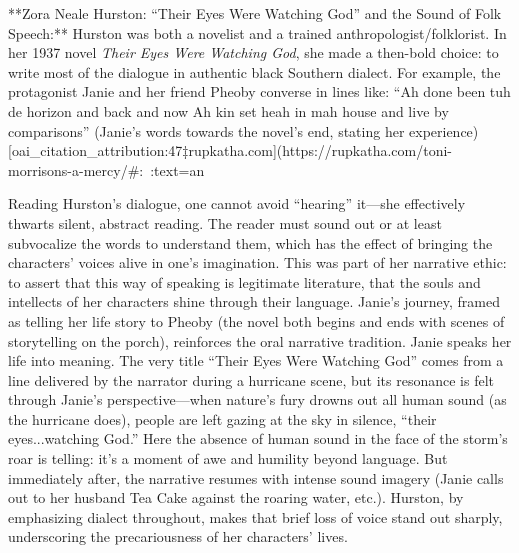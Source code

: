 \documentclass[12pt]{report}
\begin{document}
**Zora Neale Hurston: “Their Eyes Were Watching God” and the Sound of Folk Speech:** Hurston was both a novelist and a trained anthropologist/folklorist. In her 1937 novel \textit{Their Eyes Were Watching God}, she made a then-bold choice: to write most of the dialogue in authentic black Southern dialect. For example, the protagonist Janie and her friend Pheoby converse in lines like: “Ah done been tuh de horizon and back and now Ah kin set heah in mah house and live by comparisons” (Janie’s words towards the novel’s end, stating her experience) [oai_citation_attribution:47‡rupkatha.com](https://rupkatha.com/toni-morrisons-a-mercy/#:~:text=an%

Reading Hurston’s dialogue, one cannot avoid “hearing” it—she effectively thwarts silent, abstract reading. The reader must sound out or at least subvocalize the words to understand them, which has the effect of bringing the characters’ voices alive in one’s imagination. This was part of her narrative ethic: to assert that this way of speaking is legitimate literature, that the souls and intellects of her characters shine through their language. Janie’s journey, framed as telling her life story to Pheoby (the novel both begins and ends with scenes of storytelling on the porch), reinforces the oral narrative tradition. Janie speaks her life into meaning. The very title “Their Eyes Were Watching God” comes from a line delivered by the narrator during a hurricane scene, but its resonance is felt through Janie’s perspective—when nature’s fury drowns out all human sound (as the hurricane does), people are left gazing at the sky in silence, “their eyes...watching God.” Here the absence of human sound in the face of the storm’s roar is telling: it’s a moment of awe and humility beyond language. But immediately after, the narrative resumes with intense sound imagery (Janie calls out to her husband Tea Cake against the roaring water, etc.). Hurston, by emphasizing dialect throughout, makes that brief loss of voice stand out sharply, underscoring the precariousness of her characters’ lives.
\end{document}
